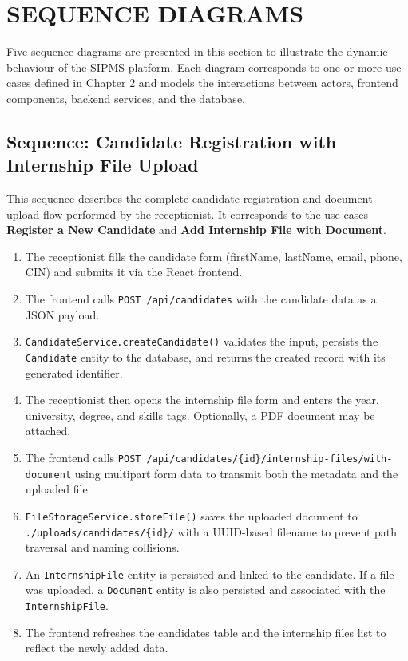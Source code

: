\section{SEQUENCE DIAGRAMS}

Five sequence diagrams are presented in this section to illustrate the dynamic behaviour of the SIPMS platform. Each diagram corresponds to one or more use cases defined in Chapter 2 and models the interactions between actors, frontend components, backend services, and the database.

\subsection{Sequence: Candidate Registration with Internship File Upload}
This sequence describes the complete candidate registration and document upload flow performed by the receptionist. It corresponds to the use cases \textbf{Register a New Candidate} and \textbf{Add Internship File with Document}.

\begin{enumerate}
    \item The receptionist fills the candidate form (firstName, lastName, email, phone, CIN) and submits it via the React frontend.
    \item The frontend calls \texttt{POST /api/candidates} with the candidate data as a JSON payload.
    \item \texttt{CandidateService.createCandidate()} validates the input, persists the \texttt{Candidate} entity to the database, and returns the created record with its generated identifier.
    \item The receptionist then opens the internship file form and enters the year, university, degree, and skills tags. Optionally, a PDF document may be attached.
    \item The frontend calls \texttt{POST /api/candidates/\{id\}/internship-files/with-document} using multipart form data to transmit both the metadata and the uploaded file.
    \item \texttt{FileStorageService.storeFile()} saves the uploaded document to \texttt{./uploads/candidates/\{id\}/} with a UUID-based filename to prevent path traversal and naming collisions.
    \item An \texttt{InternshipFile} entity is persisted and linked to the candidate. If a file was uploaded, a \texttt{Document} entity is also persisted and associated with the \texttt{InternshipFile}.
    \item The frontend refreshes the candidates table and the internship files list to reflect the newly added data.
\end{enumerate}

